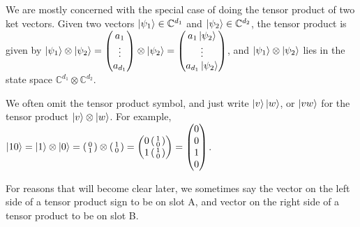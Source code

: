 {We are mostly concerned with the special case of doing the tensor product of two ket vectors. Given two vectors $\ket{\psi_1}\in\mathbb{C}^{d_1}$ and $\ket{\psi_2}\in\mathbb{C}^{d_2}$, the tensor product is given by $\ket{\psi_1} \otimes\ket{\psi_2} = \begin{pmatrix}a_1\\ \vdots \\a_{d_1}\end{pmatrix} \otimes \ket{\psi_2} = \begin{pmatrix}a_1\ket{\psi_2}\\ \vdots \\a_{d_1}\ket{\psi_2}\end{pmatrix}$, and $\ket{\psi_1} \otimes\ket{\psi_2}$ lies in the state space $\mathbb{C}^{d_1}\otimes\mathbb{C}^{d_2}$.


We often omit the tensor product symbol, and just write $\ket{v}\ket{w}$, or $\ket{vw}$ for the tensor product $\ket{v} \otimes \ket{w}$. For example, $\ket{10}=\ket{1} \otimes \ket{0}= \left(\begin{smallmatrix}0\\1\end{smallmatrix}\right) \otimes \left(\begin{smallmatrix}1\\0\end{smallmatrix}\right)
=\begin{pmatrix}
0\left(\begin{smallmatrix}1\\0\end{smallmatrix}\right)\\
1\left(\begin{smallmatrix}1\\0\end{smallmatrix}\right)
\end{pmatrix}
=\begin{pmatrix}
0\\
0\\
1\\
0
\end{pmatrix}$.

For reasons that will become clear later, we sometimes say the vector on the left side of a tensor product sign to be on slot A, and vector on the right side of a tensor product to be on slot B.


}
